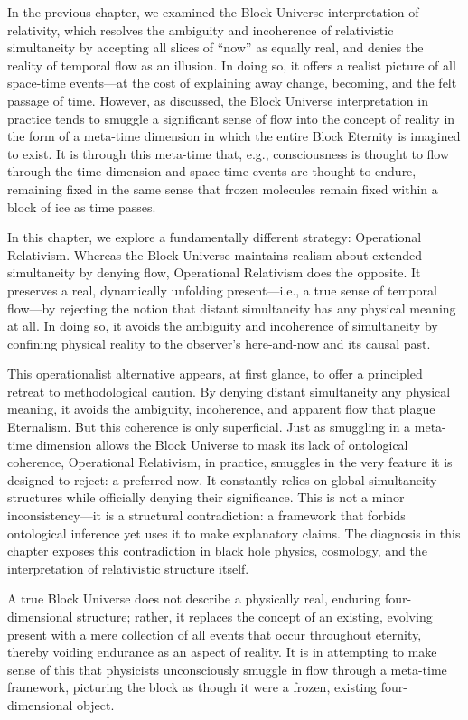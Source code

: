 \documentclass[12pt]{book}
\begin{document}
\vspace{4pt}

In the previous chapter, we examined the Block Universe interpretation of relativity, which resolves the ambiguity and incoherence of relativistic simultaneity by accepting all slices of ``now'' as equally real, and denies the reality of temporal flow as an illusion. In doing so, it offers a realist picture of all space-time events---at the cost of explaining away change, becoming, and the felt passage of time. However, as discussed, the Block Universe interpretation in practice tends to smuggle a significant sense of flow into the concept of reality in the form of a meta-time dimension in which the entire Block Eternity is imagined to exist. It is through this meta-time that, e.g., consciousness is thought to flow through the time dimension and space-time events are thought to endure, remaining fixed in the same sense that frozen molecules remain fixed within a block of ice as time passes.

In this chapter, we explore a fundamentally different strategy: Operational Relativism. Whereas the Block Universe maintains realism about extended simultaneity by denying flow, Operational Relativism does the opposite. It preserves a real, dynamically unfolding present---i.e., a true sense of temporal flow---by rejecting the notion that distant simultaneity has any physical meaning at all. In doing so, it avoids the ambiguity and incoherence of simultaneity by confining physical reality to the observer's here-and-now and its causal past.

This operationalist alternative appears, at first glance, to offer a principled retreat to methodological caution. By denying distant simultaneity any physical meaning, it avoids the ambiguity, incoherence, and apparent flow that plague Eternalism. But this coherence is only superficial. Just as smuggling in a meta-time dimension allows the Block Universe to mask its lack of ontological coherence, Operational Relativism, in practice, smuggles in the very feature it is designed to reject: a preferred now. It constantly relies on global simultaneity structures while officially denying their significance. This is not a minor inconsistency---it is a structural contradiction: a framework that forbids ontological inference yet uses it to make explanatory claims. The diagnosis in this chapter exposes this contradiction in black hole physics, cosmology, and the interpretation of relativistic structure itself.

A true Block Universe does not describe a physically real, enduring four-dimensional structure; rather, it replaces the concept of an existing, evolving present with a mere collection of all events that occur throughout eternity, thereby voiding endurance as an aspect of reality. It is in attempting to make sense of this that physicists unconsciously smuggle in flow through a meta-time framework, picturing the block as though it were a frozen, existing four-dimensional object.
\end{document}
